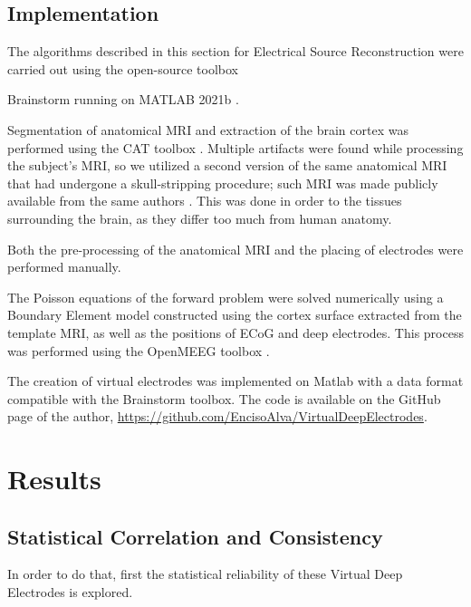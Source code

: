 \documentclass[draftcls, onecolumn, peerreview]{IEEEtran}
\begin{document}

\subsection{Implementation}

The algorithms described in this section for Electrical Source Reconstruction were carried out using the open-source toolbox

Brainstorm \cite{brainstorm} running on MATLAB 2021b \cite{matlab}.

Segmentation of anatomical MRI and extraction of the brain cortex was performed using the CAT toolbox \cite{cat12}. 
%
Multiple artifacts were found while processing the subject's MRI, so we utilized a second version of the same anatomical MRI that had undergone a skull-stripping procedure; such MRI was made publicly available from the same authors \cite{pig_template}.
%
This was done in order to the tissues surrounding the brain, as they differ too much from human anatomy.

Both the pre-processing of the anatomical MRI and the placing of electrodes were performed manually.

The Poisson equations of the forward problem were solved numerically using a Boundary Element model constructed using the cortex surface extracted from the template MRI, as well as the positions of ECoG and deep electrodes.
%
This process was performed using the OpenMEEG toolbox \cite{openmeeg}.

The creation of virtual electrodes was implemented on Matlab with a data format compatible with the Brainstorm toolbox.
%
The code is available on the GitHub page of the author,
\url{https://github.com/EncisoAlva/VirtualDeepElectrodes}.


\section{Results}

\subsection{Statistical Correlation and Consistency}
In order to do that, first the statistical reliability of these Virtual Deep Electrodes is explored.
\end{document}
